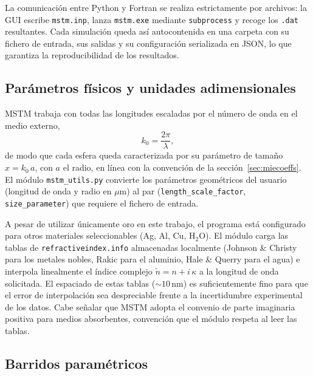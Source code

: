 La comunicación entre Python y Fortran se realiza estrictamente por
archivos: la GUI escribe \texttt{mstm.inp}, lanza \texttt{mstm.exe}
mediante \texttt{subprocess} y recoge los \texttt{.dat} resultantes.
Cada simulación queda así autocontenida en una carpeta con su fichero
de entrada, sus salidas y su configuración serializada en JSON, lo que
garantiza la reproducibilidad de los resultados.

\subsection{Parámetros físicos y unidades adimensionales}
\label{subsec:mstm_utils}

MSTM trabaja con todas las longitudes escaladas por el número de onda
en el medio externo,
\begin{equation}
    k_{0} = \frac{2\pi}{\lambda},
    \label{eq:length_scale}
\end{equation}
de modo que cada esfera queda caracterizada por su parámetro de tamaño
$x = k_{0}\,a$, con $a$ el radio, en línea con la convención de la
sección~\ref{sec:miecoeffs}. El módulo \texttt{mstm\_utils.py}
convierte los parámetros geométricos del usuario (longitud de onda y
radio en $\mu$m) al par (\texttt{length\_scale\_factor},
\texttt{size\_parameter}) que requiere el fichero de entrada.

A pesar de utilizar únicamente oro en este trabajo, 
el programa está configurado para
otros materiales seleccionables (Ag, Al, Cu,
H$_2$O). El módulo carga las tablas de \texttt{refractiveindex.info}
almacenadas localmente (Johnson \& Christy para los metales nobles,
Rakic para el aluminio, Hale \& Querry para el agua) e interpola
linealmente el índice complejo $\tilde{n} = n + i\,\kappa$ a la longitud de
onda solicitada. El espaciado de estas tablas ($\sim 10$\,nm) es
suficientemente fino para que el error de interpolación sea
despreciable frente a la incertidumbre experimental de los datos.
Cabe señalar que MSTM adopta el convenio de parte imaginaria positiva
para medios absorbentes, convención que el módulo respeta al leer las
tablas.

\subsection{Barridos paramétricos}
\label{subsec:sweeps}

